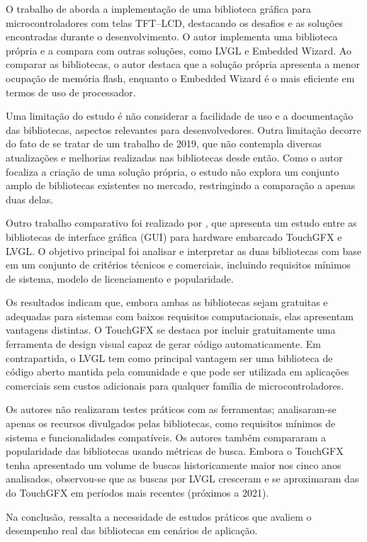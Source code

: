 O trabalho de \cite{Marciano} aborda a implementação de uma biblioteca gráfica para microcontroladores com telas TFT–LCD, destacando os desafios e as soluções encontradas durante o desenvolvimento. O autor implementa uma biblioteca própria e a compara com outras soluções, como LVGL e Embedded Wizard. Ao comparar as bibliotecas, o autor destaca que a solução própria apresenta a menor ocupação de memória flash, enquanto o Embedded Wizard é o mais eficiente em termos de uso de processador.

Uma limitação do estudo é não considerar a facilidade de uso e a documentação das bibliotecas, aspectos relevantes para desenvolvedores. Outra limitação decorre do fato de se tratar de um trabalho de 2019, que não contempla diversas atualizações e melhorias realizadas nas bibliotecas desde então. Como o autor focaliza a criação de uma solução própria, o estudo não explora um conjunto amplo de bibliotecas existentes no mercado, restringindo a comparação a apenas duas delas.

Outro trabalho comparativo foi realizado por \cite{ISNAS2021Comparison}, que apresenta um estudo entre as bibliotecas de interface gráfica (GUI) para hardware embarcado TouchGFX e LVGL. O objetivo principal foi analisar e interpretar as duas bibliotecas com base em um conjunto de critérios técnicos e comerciais, incluindo requisitos mínimos de sistema, modelo de licenciamento e popularidade.

Os resultados indicam que, embora ambas as bibliotecas sejam gratuitas e adequadas para sistemas com baixos requisitos computacionais, elas apresentam vantagens distintas. O TouchGFX se destaca por incluir gratuitamente uma ferramenta de design visual capaz de gerar código automaticamente. Em contrapartida, o LVGL tem como principal vantagem ser uma biblioteca de código aberto mantida pela comunidade e que pode ser utilizada em aplicações comerciais sem custos adicionais para qualquer família de microcontroladores.

Os autores não realizaram testes práticos com as ferramentas; analisaram-se apenas os recursos divulgados pelas bibliotecas, como requisitos mínimos de sistema e funcionalidades compatíveis. Os autores também compararam a popularidade das bibliotecas usando métricas de busca. Embora o TouchGFX tenha apresentado um volume de buscas historicamente maior nos cinco anos analisados, observou-se que as buscas por LVGL cresceram e se aproximaram das do TouchGFX em períodos mais recentes (próximos a 2021).

Na conclusão, \cite{ISNAS2021Comparison} ressalta a necessidade de estudos práticos que avaliem o desempenho real das bibliotecas em cenários de aplicação.

